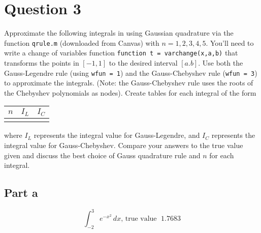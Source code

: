 \section{Question 3}

\begin{question}
    Approximate the following integrals in \MATLAB using Gaussian quadrature via the function \verb+qrule.m+ (downloaded from Canvas) with $n = 1,2,3,4,5$. You'll need to write a change of variables function \verb+function t = varchange(x,a,b)+ that transforms the points in $[-1,1]$ to the desired interval $[a.b]$. Use both the Gauss-Legendre rule (using \verb+wfun = 1+) and the Gauss-Chebyshev rule (\verb+wfun = 3+) to approximate the integrals. (Note: the Gauss-Chebyshev rule uses the roots of the Chebyshev polynomials as nodes). Create tables for each integral of the form \begin{tabular}{c|c|c} $n$ & $I_L$ & $I_C$ \\ \hline && \end{tabular} where $I_L$ represents the integral value for Gauss-Legendre, and $I_C$ represents the integral value for Gauss-Chebyshev. Compare your answers to the true value given and discuss the best choice of Gauss quadrature rule and $n$ for each integral.
\end{question}

\subsection{Part a}

\begin{question}
    \begin{equation}
        \int_{-2}^3 e^{-x^2}\, dx\text{, true value }\; 1.7683
    \end{equation}
\end{question}


